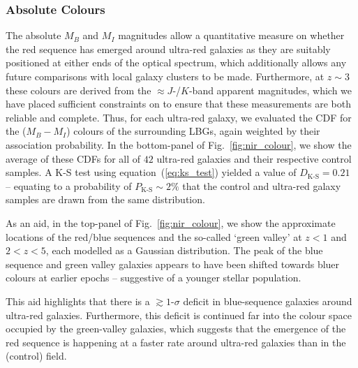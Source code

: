 \documentclass[a4paper, fleqn, usenatbib]{mnras}
\newcommand{\urg}{ultra-red galaxy}
\newcommand{\urgs}{ultra-red galaxies}
\begin{document}
\subsubsection{Absolute Colours}

The absolute $M_B$ and $M_I$ magnitudes allow a quantitative measure on whether the red sequence has emerged around \urgs{} as they are suitably positioned at either ends of the optical spectrum, which additionally allows any future comparisons with local galaxy clusters to be made.
Furthermore, at $z\sim3$ these colours are derived from the $\approx J\text{-}$/$K\text{-}$band apparent magnitudes, which we have placed sufficient constraints on to ensure that these measurements are both reliable and complete.
Thus, for each \urg{}, we evaluated the CDF for the ($M_{B}-M_{I}$) colours of the surrounding LBGs, again weighted by their association probability.
In the bottom-panel of Fig.~\ref{fig:nir_colour}, we show the average of these CDFs for all of $42$ \urgs{} and their respective control samples.
A K-S test using equation~(\ref{eq:ks_test}) yielded a value of $D_{\text{K-S}}=0.21$ -- equating to a probability of $P_{\text{K-S}}\sim2\%$ that the control and \urg{} samples are drawn from the same distribution.

As an aid, in the top-panel of Fig.~\ref{fig:nir_colour}, we show the approximate locations of the red/blue sequences and the so-called `green valley' at $z<1$ and $2<z<5$, each modelled as a Gaussian distribution.
The peak of the blue sequence and green valley galaxies appears to have been shifted towards bluer colours at earlier epochs -- suggestive of a younger stellar population.

This aid highlights that there is a $\gtrsim1\text{-}\sigma$ deficit in blue-sequence galaxies around \urgs{}.
Furthermore, this deficit is continued far into the colour space occupied by the green-valley galaxies, which suggests that the emergence of the red sequence is happening at a faster rate around \urgs{} than in the (control) field.
\end{document}

